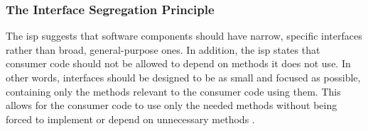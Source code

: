 \subsubsection{The Interface Segregation Principle} \label{subsubsec_isp}

The \gls{isp} suggests that software components should have narrow, specific interfaces
rather than broad, general-purpose ones. In addition, the \gls{isp} states that consumer
code should not be allowed to depend on methods it does not use. In other words,
interfaces should be designed to be as small and focused as possible, containing only the
methods relevant to the consumer code using them. This allows for the consumer code to use
only the needed methods without being forced to implement or depend on unnecessary methods
\parencite[104]{robert_c_martin_clean_2018}. 